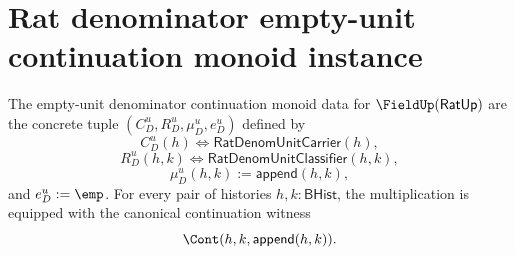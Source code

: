 \section{Rat denominator empty-unit continuation monoid instance}
\label{sec:field-rat-denominator-empty-unit-continuation-monoid-instance}

\begin{definition}
\label{def:field-rat-denominator-empty-unit-continuation-monoid-instance}
The empty-unit denominator continuation monoid data for
$\FieldUp(\mathsf{RatUp})$ are the concrete tuple
$(C_D^u,R_D^u,\mu_D^u,e_D^u)$ defined by
$$
C_D^u(h)\Longleftrightarrow\mathsf{RatDenomUnitCarrier}(h),
$$
$$
R_D^u(h,k)\Longleftrightarrow\mathsf{RatDenomUnitClassifier}(h,k),
$$
$$
\mu_D^u(h,k):=\mathsf{append}(h,k),
$$
and $e_D^u:=\emp$. For every pair of histories $h,k:\mathsf{BHist}$, the
multiplication is equipped with the canonical continuation witness
$$
\Cont(h,k,\mathsf{append}(h,k)).
$$
\end{definition}

